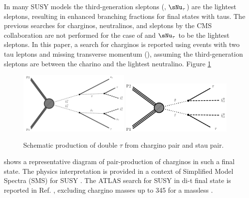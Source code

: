 In many SUSY models \cite{Martin:1997ns} the third-generation sleptons (\sTau, $\sNu_\tau$) are the lightest sleptons, 
resulting in enhanced branching fractions for final states with taus. The previous searches for charginos, neutralinos, 
and sleptons by the CMS collaboration \cite{Khachatryan:2014qwa} are not performed for the case of \stau and $\sNu_\tau$
to be the lightest sleptons. In this paper, a search for charginos is reported using events with two tau leptons and 
missing transverse momentum (\MPT), assuming the third-generation sleptons are between the charino and the lightest neutralino. 
Figure \ref{fig:Productions} 
\begin{figure}[!Hhtb]
\centering
\includegraphics[width=0.49\textwidth]{Introductionfigs/TChipmSlepSnu.pdf}
\includegraphics[width=0.49\textwidth]{Introductionfigs/TSlepSlep.pdf}
\caption{Schematic production of double $\tau$ from chargino pair and stau pair.}
\label{fig:Productions}
\end{figure}
shows a representative diagram of pair-production of charginos in such a final state. 
The physics interpretation is provided in a context of Simplified Model Spectra (SMS) for SUSY \cite{Alwall:2008ag,alves:sms}.
The ATLAS search for SUSY in di-t final state is reported in Ref. \cite{Aad:2014yka}, excluding chargino masses up to 345 \GeV 
for a massless \PSGczDo.





